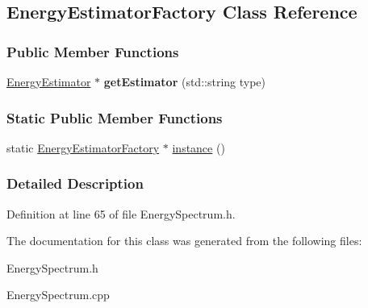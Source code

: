 \hypertarget{classEnergyEstimatorFactory}{
\subsection{EnergyEstimatorFactory Class Reference}
\label{classEnergyEstimatorFactory}
}
\subsubsection*{Public Member Functions}
\begin{DoxyCompactItemize}
\item 
\hypertarget{classEnergyEstimatorFactory_aec2a2f82f0fe51b26557e046de5bec82}{
\hyperlink{structEnergyEstimator}{EnergyEstimator} $\ast$ {\bfseries getEstimator} (std::string type)}
\label{classEnergyEstimatorFactory_aec2a2f82f0fe51b26557e046de5bec82}

\end{DoxyCompactItemize}
\subsubsection*{Static Public Member Functions}
\begin{DoxyCompactItemize}
\item 
\hypertarget{classEnergyEstimatorFactory_af654e8785f7012147fd5467451053890}{
static \hyperlink{classEnergyEstimatorFactory}{EnergyEstimatorFactory} $\ast$ \hyperlink{classEnergyEstimatorFactory_af654e8785f7012147fd5467451053890}{instance} ()}
\label{classEnergyEstimatorFactory_af654e8785f7012147fd5467451053890}

\end{DoxyCompactItemize}


\subsubsection{Detailed Description}


Definition at line 65 of file EnergySpectrum.h.



The documentation for this class was generated from the following files:\begin{DoxyCompactItemize}
\item 
EnergySpectrum.h\item 
EnergySpectrum.cpp\end{DoxyCompactItemize}
